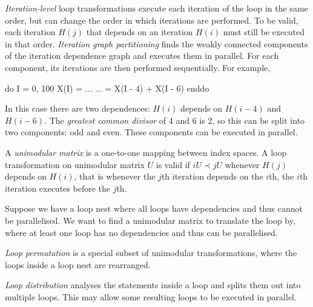 \emph{Iteration-level} loop transformations execute each iteration of the loop in the same order, but can change the order in which iterations are performed.
To be valid, each iteration $H(j)$ that depends on an iteration $H(i)$ must still be executed in that order.
\emph{Iteration graph partitioning} finds the weakly connected components of the iteration dependence graph and executes them in parallel. For each component, its iterations are then performed sequentially.
For example,
\begin{code}
do I = 0, 100
    X(I) = ...
    ...  = X(I - 4) + X(I - 6)
enddo
\end{code}
In this case there are two dependences: $H(i)$ depends on $H(i-4)$ and $H(i-6)$.
The \emph{greatest common divisor} of 4 and 6 is 2, so this can be split into two components: odd and even.
These components can be executed in parallel.

A \emph{unimodular matrix} is a one-to-one mapping between index spaces.
A loop transformation on unimodular matrix $U$ is valid if $iU \prec jU$ whenever $H(j)$ depends on $H(i)$,
that is whenever the $j$th iteration depends on the $i$th, the $i$th iteration executes before the $j$th.

Suppose we have a loop nest where all loops have dependencies and thus cannot be parallelised.
We want to find a unimodular matrix to translate the loop by, where at least one loop has no dependencies
and thus can be parallelised.

\emph{Loop permutation} is a special subset of unimodular transformations, where the loops inside a loop nest are rearranged.

\emph{Loop distribution} analyses the statements inside a loop and splits them out into multiple loops.
This may allow some resulting loops to be executed in parallel.

